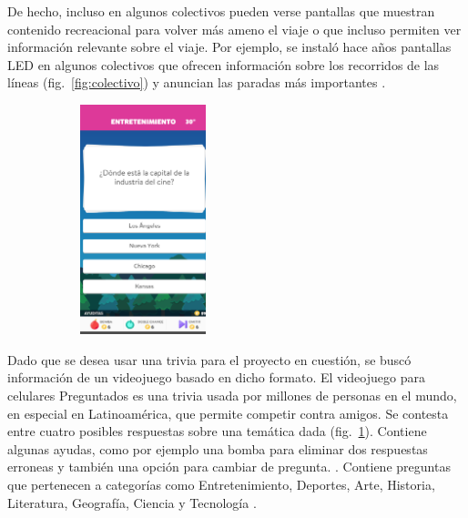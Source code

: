 \documentclass{article}
\begin{document}
De hecho, incluso en algunos colectivos pueden verse pantallas que muestran contenido recreacional para volver más ameno el viaje o que incluso permiten ver información relevante sobre el viaje. Por ejemplo, se instaló hace años pantallas LED en algunos colectivos que ofrecen información sobre los recorridos de las líneas (fig.~\ref{fig:colectivo}) y anuncian las paradas más importantes \parencite{lacapitalColectivos}.
\begin{figure}[H]
	\caption{Preguntados}
    \begin{subfigure}{1.0\textwidth}
	\includegraphics[width=0.4\textwidth]{preguntados.png}
    \end{subfigure}
	\label{fig:preguntados}
\end{figure}
\vspace{-1.0\baselineskip}
Dado que se desea usar una trivia para el proyecto en cuestión, se buscó información de un videojuego basado en dicho formato. El videojuego para celulares Preguntados es una trivia usada por millones de personas en el mundo, en especial en Latinoamérica, que permite competir contra amigos. Se contesta entre cuatro posibles respuestas sobre una temática dada (fig.~\ref{fig:preguntados}). Contiene algunas ayudas, como por ejemplo una bomba para eliminar dos respuestas erroneas y también una opción para cambiar de pregunta. \parencite{minutouno}. Contiene preguntas que pertenecen a categorías como Entretenimiento, Deportes, Arte, Historia, Literatura, Geografía, Ciencia y Tecnología \parencite{abcPreguntados}.
\end{document}
